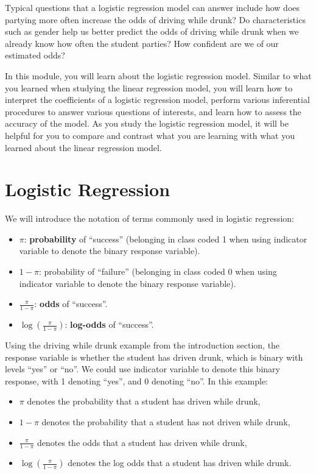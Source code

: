 \documentclass[
]{book}
\providecommand{\tightlist}{%
  \setlength{\itemsep}{0pt}\setlength{\parskip}{0pt}}
\begin{document}
Typical questions that a logistic regression model can answer include how does partying more often increase the odds of driving while drunk? Do characteristics such as gender help us better predict the odds of driving while drunk when we already know how often the student parties? How confident are we of our estimated odds?

In this module, you will learn about the logistic regression model. Similar to what you learned when studying the linear regression model, you will learn how to interpret the coefficients of a logistic regression model, perform various inferential procedures to answer various questions of interests, and learn how to assess the accuracy of the model. As you study the logistic regression model, it will be helpful for you to compare and contrast what you are learning with what you learned about the linear regression model.

\hypertarget{logistic-regression}{%
\section{Logistic Regression}\label{logistic-regression}}

We will introduce the notation of terms commonly used in logistic regression:

\begin{itemize}
\tightlist
\item
  \(\pi\): \textbf{probability} of ``success'' (belonging in class coded 1 when using indicator variable to denote the binary response variable).
\item
  \(1-\pi\): probability of ``failure'' (belonging in class coded 0 when using indicator variable to denote the binary response variable).
\item
  \(\frac{\pi}{1-\pi}\): \textbf{odds} of ``success''.
\item
  \(\log \left( \frac{\pi}{1-\pi} \right)\): \textbf{log-odds} of ``success''.
\end{itemize}

Using the driving while drunk example from the introduction section, the response variable is whether the student has driven drunk, which is binary with levels ``yes'' or ``no''. We could use indicator variable to denote this binary response, with 1 denoting ``yes'', and 0 denoting ``no''. In this example:

\begin{itemize}
\tightlist
\item
  \(\pi\) denotes the probability that a student has driven while drunk,
\item
  \(1-\pi\) denotes the probability that a student has not driven while drunk,
\item
  \(\frac{\pi}{1-\pi}\) denotes the odds that a student has driven while drunk,
\item
  \(\log \left( \frac{\pi}{1-\pi} \right)\) denotes the log odds that a student has driven while drunk.
\end{itemize}
\end{document}
